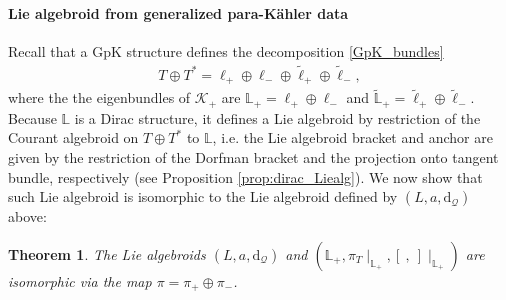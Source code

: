 \documentclass{article}
\newcommand{\TT}{{T\oplus T^*}}
\newcommand{\KK}{\mathcal{K}}
\newcommand{\QQ}{\mathcal{Q}}
\newcommand{\rd}{\mathrm{d}}
\newcommand{\Lb}{\mathbb{L}}
\newcommand{\ellt}{{\tl{\ell}}}
\newcommand{\brac}{[\ ,\ ]}
\newcommand{\wtl}{\widetilde}
\def\tl{\tilde}
\newtheorem{theorem}{Theorem}[section]
\theoremstyle{definition}
\theoremstyle{remark}
\begin{document}
\paragraph{Lie algebroid from generalized para-K\"ahler data} Recall that a GpK structure defines the decomposition \eqref{GpK_bundles}
\begin{align*}
\TT=\ell_+\oplus\ell_-\oplus \ellt_+\oplus \ellt_-,
\end{align*}
where the the eigenbundles of $\KK_+$ are $\Lb_+=\ell_+\oplus\ell_-$ and $\wtl{\Lb}_+=\ellt_+\oplus \ellt_-$. Because $\Lb$ is a Dirac structure, it defines a Lie algebroid by restriction of the Courant algebroid on $\TT$ to $\Lb$, i.e. the Lie algebroid bracket and anchor are given by the restriction of the Dorfman bracket and the projection onto tangent bundle, respectively (see Proposition \ref{prop:dirac_Liealg}). We now show that such Lie algebroid is isomorphic to the Lie algebroid defined by $(L,a,\rd_\QQ)$ above:
\begin{theorem}
The Lie algebroids $(L,a,\rd_\QQ)$ and $(\Lb_+,\pi_T\!\!\mid_{\Lb_+},\brac\!\!\mid_{\Lb_+})$ are isomorphic via the map $\pi=\pi_+\oplus \pi_-$.
\end{theorem}
\end{document}

